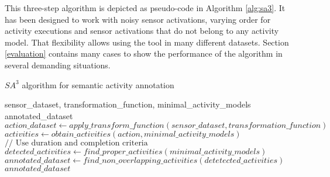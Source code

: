This three-step algorithm is depicted as pseudo-code in Algorithm \ref{alg:sa3}. It has been designed to work with noisy sensor activations, varying order for activity executions and sensor activations that do not belong to any activity model. That flexibility allows using the tool in many different datasets. Section \ref{evaluation} contains many cases to show the performance of the algorithm in several demanding situations.

\begin{algorithm}
 \caption{$SA^3$ algorithm for semantic activity annotation}
 \label{alg:sa3}
 \begin{algorithmic}
 \REQUIRE sensor\_dataset, transformation\_function, minimal\_activity\_models
 \ENSURE annotated\_dataset
 \STATE $action\_dataset \leftarrow apply\_transform\_function(sensor\_dataset, transformation\_function)$
    \STATE $activities \leftarrow obtain\_activities(action, minimal\_activity\_models)$
  \ENDIF
    \STATE $// \text{ Use duration and completion criteria}$
    \STATE $detected\_activities \leftarrow find\_proper\_activities(minimal\_activity\_models)$
  \ENDFOR
 \ENDFOR
 \STATE $annotated\_dataset \leftarrow find\_non\_overlapping\_activities(detetected\_activities)$
 \RETURN $annotated\_dataset$
 \end{algorithmic}
\end{algorithm}
